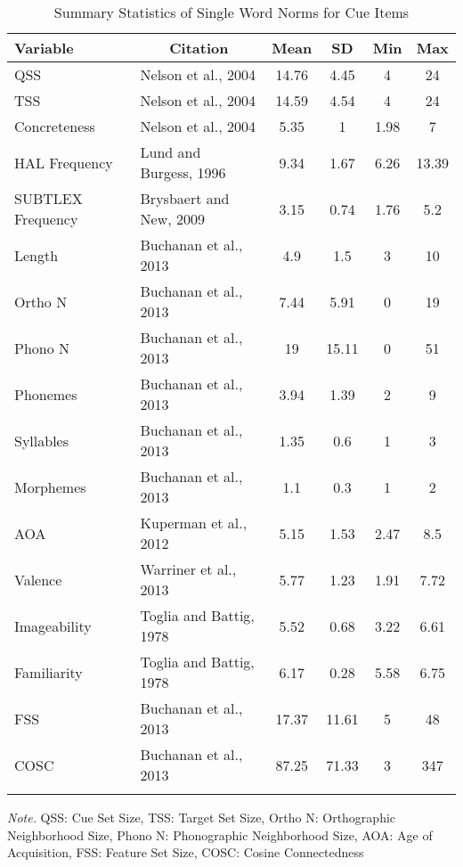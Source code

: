 \documentclass[english,man]{apa6}
\theoremstyle{definition}
\theoremstyle{definition}
\theoremstyle{remark}
\begin{document}
\begin{table}[tbp]
\begin{center}
\begin{threeparttable}
\caption{\label{tab:unnamed-chunk-2}Summary Statistics of Single Word Norms for Cue Items}
\begin{tabular}{llcccc}
\toprule
Variable & \multicolumn{1}{c}{Citation} & \multicolumn{1}{c}{Mean} & \multicolumn{1}{c}{SD} & \multicolumn{1}{c}{Min} & \multicolumn{1}{c}{Max}\\
\midrule
QSS & Nelson et al., 2004 & 14.76 & 4.45 & 4 & 24\\
TSS & Nelson et al., 2004 & 14.59 & 4.54 & 4 & 24\\
Concreteness & Nelson et al., 2004 & 5.35 & 1 & 1.98 & 7\\
HAL Frequency & Lund and Burgess, 1996 & 9.34 & 1.67 & 6.26 & 13.39\\
SUBTLEX Frequency & Brysbaert and New, 2009 & 3.15 & 0.74 & 1.76 & 5.2\\
Length & Buchanan et al., 2013 & 4.9 & 1.5 & 3 & 10\\
Ortho N & Buchanan et al., 2013 & 7.44 & 5.91 & 0 & 19\\
Phono N & Buchanan et al., 2013 & 19 & 15.11 & 0 & 51\\
Phonemes & Buchanan et al., 2013 & 3.94 & 1.39 & 2 & 9\\
Syllables & Buchanan et al., 2013 & 1.35 & 0.6 & 1 & 3\\
Morphemes & Buchanan et al., 2013 & 1.1 & 0.3 & 1 & 2\\
AOA & Kuperman et al., 2012 & 5.15 & 1.53 & 2.47 & 8.5\\
Valence & Warriner et al., 2013 & 5.77 & 1.23 & 1.91 & 7.72\\
Imageability & Toglia and Battig, 1978 & 5.52 & 0.68 & 3.22 & 6.61\\
Familiarity & Toglia and Battig, 1978 & 6.17 & 0.28 & 5.58 & 6.75\\
FSS & Buchanan et al., 2013 & 17.37 & 11.61 & 5 & 48\\
COSC & Buchanan et al., 2013 & 87.25 & 71.33 & 3 & 347\\
\bottomrule
\addlinespace
\end{tabular}
\begin{tablenotes}[para]
\textit{Note.} QSS: Cue Set Size, TSS: Target Set Size, Ortho N: Orthographic Neighborhood Size, Phono N: Phonographic Neighborhood Size, AOA: Age of Acquisition, FSS: Feature Set Size, COSC: Cosine Connectedness
\end{tablenotes}
\end{threeparttable}
\end{center}
\end{table}
\end{document}
